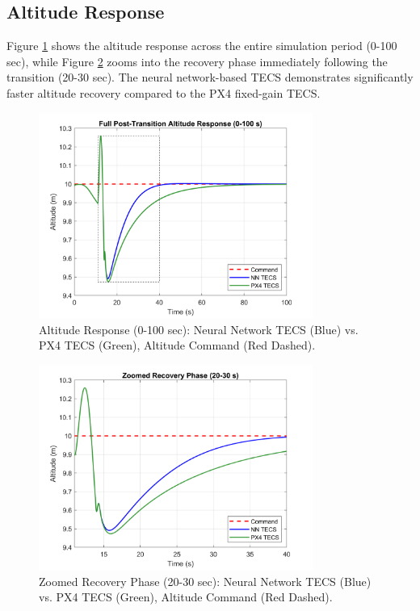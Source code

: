 \documentclass[journal,article,submit,pdftex,moreauthors]{Definitions/mdpi}
\begin{document}
\subsection{Altitude Response}
Figure \ref{fig:full_altitude} shows the altitude response across the entire simulation period (0-100 sec), while Figure \ref{fig:zoomed_altitude} zooms into the recovery phase immediately following the transition (20-30 sec). The neural network-based TECS demonstrates significantly faster altitude recovery compared to the PX4 fixed-gain TECS.

\begin{figure}[H]
    \centering
    \includegraphics[width=0.8\textwidth]{full_altitude_plot.png}
    \caption{Altitude Response (0-100 sec): Neural Network TECS (Blue) vs. PX4 TECS (Green), Altitude Command (Red Dashed).}
    \label{fig:full_altitude}
\end{figure}

\begin{figure}[H]
    \centering
    \includegraphics[width=0.8\textwidth]{zoomed_altitude_plot.png}
    \caption{Zoomed Recovery Phase (20-30 sec): Neural Network TECS (Blue) vs. PX4 TECS (Green), Altitude Command (Red Dashed).}
    \label{fig:zoomed_altitude}
\end{figure}
\end{document}
